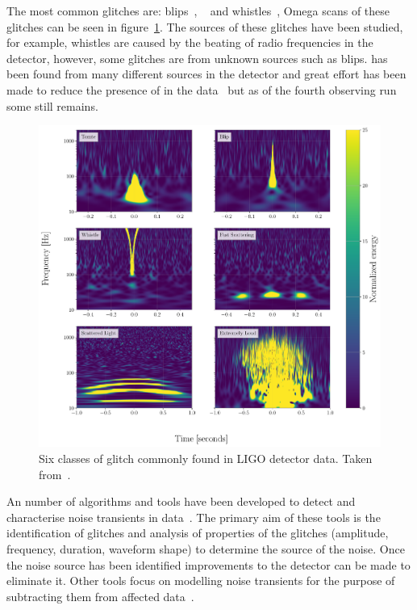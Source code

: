 The most common glitches are: blips~\cite{blips:2019}, \scl~\cite{ArchEnemy:2023} and whistles~\cite{glitschen:2021}, Omega scans of these glitches can be seen in figure~\ref{3:fig:glitches_subset}. The sources of these glitches have been studied, for example, whistles are caused by the beating of radio frequencies in the detector, however, some glitches are from unknown sources such as blips. \Scl has been found from many different sources in the detector and great effort has been made to reduce the presence of \scl in the data~\cite{reducing_scattering:2020} but as of the fourth observing run some \scl still remains.
%
\begin{figure}
    \centering
    \includegraphics[width=1.0\linewidth]{images/3_detector_characterisation/glitches_subset.pdf}
    \caption{Six classes of glitch commonly found in LIGO detector data. Taken from~\cite{GlitchPlot:2024, gravityspy:2023}.}
    \label{3:fig:glitches_subset}
\end{figure}
%


An number of algorithms and tools have been developed to detect and characterise noise transients in \gwadj data~\cite{ArchEnemy:2023, reducing_scattering:2020, Glanzer:2023, gravityspy:2017, gravityspy:2021, gravityspy:2023, glitschen:2021,  BayesWave:2015, gwadaptive:2022, O3_subtraction:2022, Powell:2016, glitschen:2021}. The primary aim of these tools is the identification of glitches and analysis of properties of the glitches (amplitude, frequency, duration, waveform shape) to determine the source of the noise. Once the noise source has been identified improvements to the detector can be made to eliminate it. Other tools focus on modelling noise transients for the purpose of subtracting them from affected \gwadj data~\cite{ArchEnemy:2023, BayesWave:2015, glitschen:2021, antiglitch:2023}.
%
%

